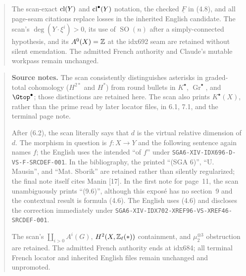 \begin{quote}
The scan-exact $\operatorname{cl}(Y)$ and $\operatorname{cl}^\bullet(Y)$ notation, the checked
$\underline F$ in (4.8), and all page-seam citations replace losses in the
inherited English candidate. The scan's $\deg(Y\cdot\xi^i)>0$, its use of
$\operatorname{SO}(n)$ after a simply-connected hypothesis, and its
$A^0(X)=\mathbb Z$ at the idx692 seam are retained without silent emendation.
The admitted French authority and Claude's mutable workpass remain
unchanged.
\end{quote}

\begin{quote}\footnotesize\raggedright
\textbf{Source notes.}
The scan consistently distinguishes asterisks in graded-total cohomology
($H^{2*}$ and $H^*$) from round bullets in $K^\bullet$,
$\operatorname{Gr}^\bullet$, and $\Gtop^\bullet$; those distinctions are
retained here. The scan also prints $K^\bullet(X)$, rather than the prime
read by later locator files, in 6.1, 7.1, and the terminal page note.

After (6.2), the scan literally says that $d$ is the virtual relative
dimension of $d$. The morphism in question is $f:X\to Y$ and the following
sentence again names $f$; the English uses the intended ``of $f$'' under
\nolinkurl{SGA6-XIV-IDX696-D-VS-F-SRCDEF-001}. In the bibliography, the
printed ``(SGA 6)'', ``U. Mausin'', and ``Mat. Sborik'' are retained rather
than silently regularized; the final note itself cites Manin [17]. In the
first note for page~11, the scan unambiguously prints ``(9.6)'', although
this expos\'e has no section~9 and the contextual result is formula (4.6).
The English uses (4.6) and discloses the correction immediately under
\nolinkurl{SGA6-XIV-IDX702-XREF96-VS-XREF46-SRCDEF-001}.

The scan's $\coprod_{i>0}A^i(G)$, $H^2(X,\mathbb Z_\ell(*))$ containment, and
$\mu_2^{\otimes3}$ obstruction are retained. The admitted French authority
ends at idx684; all terminal French locator and inherited English files
remain unchanged and unpromoted.
\end{quote}
